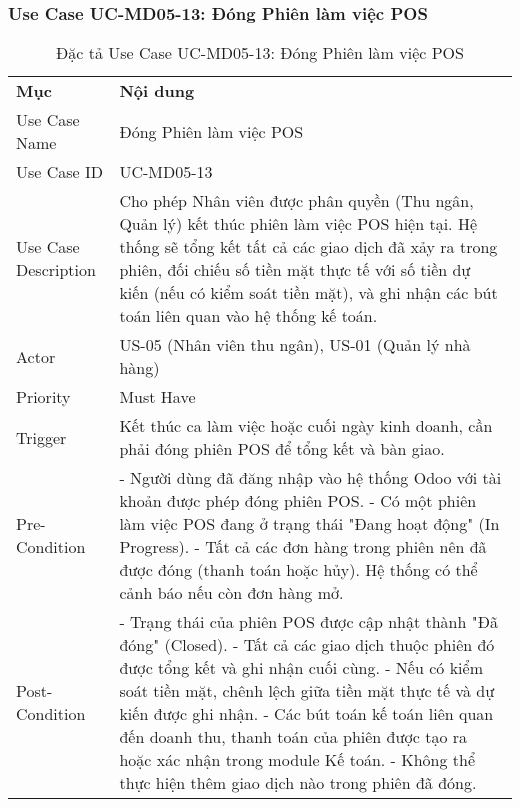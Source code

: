 \subsubsection{Use Case UC-MD05-13: Đóng Phiên làm việc POS}

\begin{longtable}{|m{4cm}|p{11cm}|}
\caption{Đặc tả Use Case UC-MD05-13: Đóng Phiên làm việc POS} \label{tab:uc_md05_13} \\
\hline

\endhead %
\hline
\endfoot %
\hline
\endlastfoot %
\multicolumn{2}{|c|}{\textbf{2.1. Tóm tắt (Summary)}} \\
\hline
\textbf{Mục} & \textbf{Nội dung} \\
\hline
Use Case Name & Đóng Phiên làm việc POS \\
\hline
Use Case ID & UC-MD05-13 \\
\hline
Use Case Description & Cho phép Nhân viên được phân quyền (Thu ngân, Quản lý) kết thúc phiên làm việc POS hiện tại. Hệ thống sẽ tổng kết tất cả các giao dịch đã xảy ra trong phiên, đối chiếu số tiền mặt thực tế với số tiền dự kiến (nếu có kiểm soát tiền mặt), và ghi nhận các bút toán liên quan vào hệ thống kế toán. \\
\hline
Actor & US-05 (Nhân viên thu ngân), US-01 (Quản lý nhà hàng) \\
\hline
Priority & Must Have \\
\hline
Trigger & Kết thúc ca làm việc hoặc cuối ngày kinh doanh, cần phải đóng phiên POS để tổng kết và bàn giao. \\
\hline
Pre-Condition & - Người dùng đã đăng nhập vào hệ thống Odoo với tài khoản được phép đóng phiên POS. \newline - Có một phiên làm việc POS đang ở trạng thái "Đang hoạt động" (In Progress). \newline - Tất cả các đơn hàng trong phiên nên đã được đóng (thanh toán hoặc hủy). Hệ thống có thể cảnh báo nếu còn đơn hàng mở. \\
\hline
Post-Condition & - Trạng thái của phiên POS được cập nhật thành "Đã đóng" (Closed). \newline - Tất cả các giao dịch thuộc phiên đó được tổng kết và ghi nhận cuối cùng. \newline - Nếu có kiểm soát tiền mặt, chênh lệch giữa tiền mặt thực tế và dự kiến được ghi nhận. \newline - Các bút toán kế toán liên quan đến doanh thu, thanh toán của phiên được tạo ra hoặc xác nhận trong module Kế toán. \newline - Không thể thực hiện thêm giao dịch nào trong phiên đã đóng. \\

\end{longtable}
